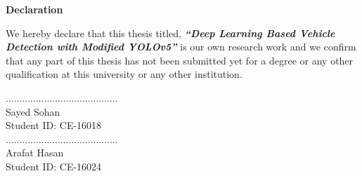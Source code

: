 \begin{titlepage}

\begin{center}
    
    \LARGE
    \textbf{Declaration\\}
    
\end{center}

    \vspace{1.5cm}
    \normalsize
    \noindent
    We hereby declare that this thesis titled, \textbf{\textit{\enquote{Deep Learning Based Vehicle Detection with Modified YOLOv5}}} is our own research work and we confirm that any part of this thesis has not been submitted yet for a degree or any other qualification at this university or any other institution.
    
    \vspace{9cm}

\begin{flushright}
        .........................................\\
         Sayed Sohan \\ Student ID: CE-16018 \\
        
        \vspace{1cm} 
         .........................................\\
        
         Arafat Hasan \\ Student ID: CE-16024


\end{flushright}



\end{titlepage}